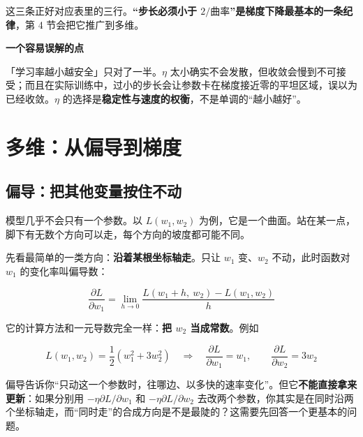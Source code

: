 \documentclass[UTF8, a4paper, zihao=-4, fontset=none]{ctexart}
\begin{document}
这三条正好对应表里的三行。\textbf{“步长必须小于 $2/\text{曲率}$”是梯度下降最基本的一条纪律}，第 4 节会把它推广到多维。



\begin{warnbox}
{\bfseries\sffamily\small\color{warn} 一个容易误解的点}\par\vspace{2pt}
「学习率越小越安全」只对了一半。$\eta$ 太小确实不会发散，但收敛会慢到不可接受；而且在实际训练中，过小的步长会让参数卡在梯度接近零的平坦区域，误以为已经收敛。$\eta$ 的选择是\textbf{稳定性与速度的权衡}，不是单调的“越小越好”。


\end{warnbox}




\section{多维：从偏导到梯度}




\subsection{偏导：把其他变量按住不动}



模型几乎不会只有一个参数。以 $L(w_1,w_2)$ 为例，它是一个曲面。站在某一点，脚下有无数个方向可以走，每个方向的坡度都可能不同。



先看最简单的一类方向：\textbf{沿着某根坐标轴走}。只让 $w_1$ 变、$w_2$ 不动，此时函数对 $w_1$ 的变化率叫偏导数：


\[
\frac{\partial L}{\partial w_1}=\lim_{h\to0}\frac{L(w_1+h,\ w_2)-L(w_1,w_2)}{h}
\]


它的计算方法和一元导数完全一样：\textbf{把 $w_2$ 当成常数}。例如


\[
L(w_1,w_2)=\frac12\left(w_1^2+3w_2^2\right)
\quad\Longrightarrow\quad
\frac{\partial L}{\partial w_1}=w_1,\qquad
\frac{\partial L}{\partial w_2}=3w_2
\]


偏导告诉你“只动这一个参数时，往哪边、以多快的速率变化”。但它\textbf{不能直接拿来更新}：如果分别用 $-\eta\partial L/\partial w_1$ 和 $-\eta\partial L/\partial w_2$ 去改两个参数，你其实是在同时沿两个坐标轴走，而“同时走”的合成方向是不是最陡的？这需要先回答一个更基本的问题。




\end{document}
